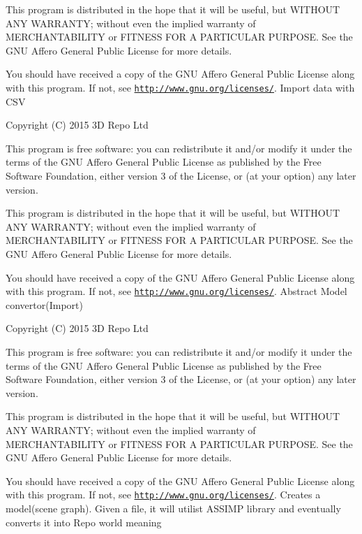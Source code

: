 This program is distributed in the hope that it will be useful, but W\+I\+T\+H\+O\+U\+T A\+N\+Y W\+A\+R\+R\+A\+N\+T\+Y; without even the implied warranty of M\+E\+R\+C\+H\+A\+N\+T\+A\+B\+I\+L\+I\+T\+Y or F\+I\+T\+N\+E\+S\+S F\+O\+R A P\+A\+R\+T\+I\+C\+U\+L\+A\+R P\+U\+R\+P\+O\+S\+E. See the G\+N\+U Affero General Public License for more details.

You should have received a copy of the G\+N\+U Affero General Public License along with this program. If not, see \href{http://www.gnu.org/licenses/}{\tt http\+://www.\+gnu.\+org/licenses/}. Import data with C\+S\+V

Copyright (C) 2015 3\+D Repo Ltd

This program is free software\+: you can redistribute it and/or modify it under the terms of the G\+N\+U Affero General Public License as published by the Free Software Foundation, either version 3 of the License, or (at your option) any later version.

This program is distributed in the hope that it will be useful, but W\+I\+T\+H\+O\+U\+T A\+N\+Y W\+A\+R\+R\+A\+N\+T\+Y; without even the implied warranty of M\+E\+R\+C\+H\+A\+N\+T\+A\+B\+I\+L\+I\+T\+Y or F\+I\+T\+N\+E\+S\+S F\+O\+R A P\+A\+R\+T\+I\+C\+U\+L\+A\+R P\+U\+R\+P\+O\+S\+E. See the G\+N\+U Affero General Public License for more details.

You should have received a copy of the G\+N\+U Affero General Public License along with this program. If not, see \href{http://www.gnu.org/licenses/}{\tt http\+://www.\+gnu.\+org/licenses/}. Abstract Model convertor(\+Import)

Copyright (C) 2015 3\+D Repo Ltd

This program is free software\+: you can redistribute it and/or modify it under the terms of the G\+N\+U Affero General Public License as published by the Free Software Foundation, either version 3 of the License, or (at your option) any later version.

This program is distributed in the hope that it will be useful, but W\+I\+T\+H\+O\+U\+T A\+N\+Y W\+A\+R\+R\+A\+N\+T\+Y; without even the implied warranty of M\+E\+R\+C\+H\+A\+N\+T\+A\+B\+I\+L\+I\+T\+Y or F\+I\+T\+N\+E\+S\+S F\+O\+R A P\+A\+R\+T\+I\+C\+U\+L\+A\+R P\+U\+R\+P\+O\+S\+E. See the G\+N\+U Affero General Public License for more details.

You should have received a copy of the G\+N\+U Affero General Public License along with this program. If not, see \href{http://www.gnu.org/licenses/}{\tt http\+://www.\+gnu.\+org/licenses/}. Creates a model(scene graph). Given a file, it will utilist A\+S\+S\+I\+M\+P library and eventually converts it into Repo world meaning

